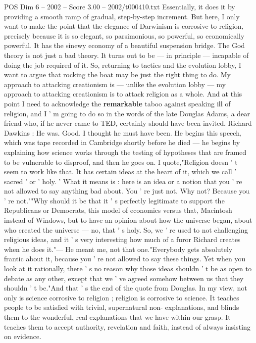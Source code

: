 \begin{textsample}{POS Dim 6 – 2002 – Score 3.00 – 2002/t000410.txt}
Essentially, it does it by providing a smooth ramp of gradual, step-by-step increment.
But here, I only want to make the point that the elegance of Darwinism is corrosive to religion, precisely because it is so elegant, so parsimonious, so powerful, so economically powerful.
It has the sinewy economy of a beautiful suspension bridge.
The God theory is not just a bad theory.
It turns out to be — in principle — incapable of doing the job required of it.
So, returning to tactics and the evolution lobby, I want to argue that rocking the boat may be just the right thing to do.
My approach to attacking creationism is — unlike the evolution lobby — my approach to attacking creationism is to attack religion as a whole.
And at this point I need to acknowledge the \textbf{remarkable} taboo against speaking ill of religion, and I ' m going to do so in the words of the late Douglas Adams, a dear friend who, if he never came to TED, certainly should have been invited.
Richard Dawkins : He was.
Good.
I thought he must have been.
He begins this speech, which was tape recorded in Cambridge shortly before he died — he begins by explaining how science works through the testing of hypotheses that are framed to be vulnerable to disproof, and then he goes on.
I quote,"Religion doesn ' t seem to work like that.
It has certain ideas at the heart of it, which we call ' sacred ' or ' holy. ' What it means is : here is an idea or a notion that you ' re not allowed to say anything bad about.
You ' re just not.
Why not?
Because you ' re not.""Why should it be that it ' s perfectly legitimate to support the Republicans or Democrats, this model of economics versus that, Macintosh instead of Windows, but to have an opinion about how the universe began, about who created the universe — no, that ' s holy.
So, we ' re used to not challenging religious ideas, and it ' s very interesting how much of a furor Richard creates when he does it."— He meant me, not that one."Everybody gets absolutely frantic about it, because you ' re not allowed to say these things.
Yet when you look at it rationally, there ' s no reason why those ideas shouldn ' t be as open to debate as any other, except that we ' ve agreed somehow between us that they shouldn ' t be."And that ' s the end of the quote from Douglas.
In my view, not only is science corrosive to religion ; religion is corrosive to science.
It teaches people to be satisfied with trivial, supernatural non- explanations, and blinds them to the wonderful, real explanations that we have within our grasp.
It teaches them to accept authority, revelation and faith, instead of always insisting on evidence.

\end{textsample}
